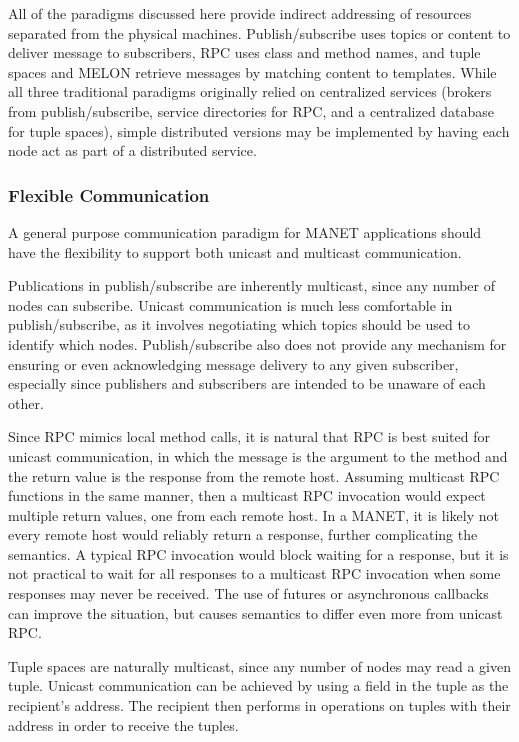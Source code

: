 \documentclass{llncs}
\begin{document}
All of the paradigms discussed here provide indirect addressing of resources separated from the physical machines. Publish/subscribe uses topics or content to deliver message to subscribers, RPC uses class and method names, and tuple spaces and MELON retrieve messages by matching content to templates. While all three traditional paradigms originally relied on centralized services (brokers from publish/subscribe, service directories for RPC, and a centralized database for tuple spaces), simple distributed versions may be implemented by having each node act as part of a distributed service.
    
\subsubsection{Flexible Communication}

A general purpose communication paradigm for MANET applications should have the flexibility to support both unicast and multicast communication.

Publications in publish/subscribe are inherently multicast, since any number of nodes can subscribe. Unicast communication is much less comfortable in publish/subscribe, as it involves negotiating which topics should be used to identify which nodes. Publish/subscribe also does not provide any mechanism for ensuring or even acknowledging message delivery to any given subscriber, especially since publishers and subscribers are intended to be unaware of each other.

Since RPC mimics local method calls, it is natural that RPC is best suited for unicast communication, in which the message is the argument to the method and the return value is the response from the remote host. Assuming multicast RPC functions in the same manner, then a multicast RPC invocation would expect multiple return values, one from each remote host. In a MANET, it is likely not every remote host would reliably return a response, further complicating the semantics. A typical RPC invocation would block waiting for a response, but it is not practical to wait for all responses to a multicast RPC invocation when some responses may never be received. The use of futures or asynchronous callbacks can improve the situation, but causes semantics to differ even more from unicast RPC.

Tuple spaces are naturally multicast, since any number of nodes may read a given tuple. Unicast communication can be achieved by using a field in the tuple as the recipient’s address. The recipient then performs in operations on tuples with their address in order to receive the tuples.
\end{document}
